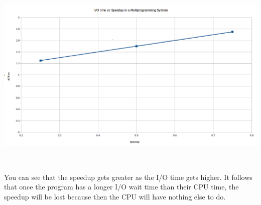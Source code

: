 \documentclass[12pt]{extarticle}
\begin{document}
\begin{enumerate}
				\includegraphics[width=15cm,height=10cm]{pic}\\
				You can see that the speedup gets greater as the I/O time gets higher.  It follows that once the program has a longer I/O wait time than their CPU time, the speedup will be lost because then the CPU will have nothing else to do.
		\end{enumerate}
\end{document}
